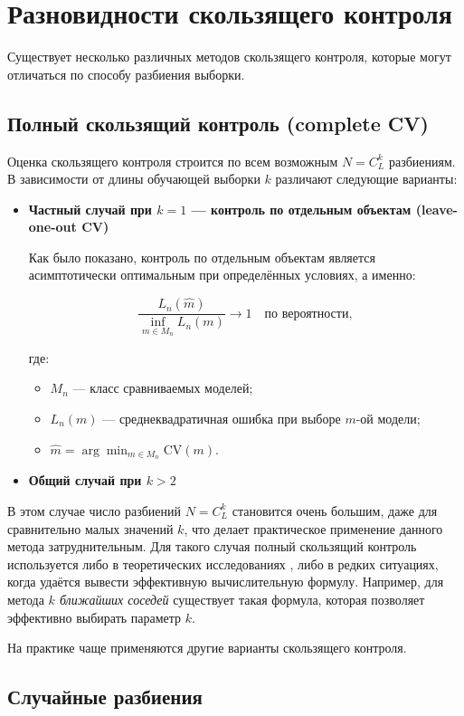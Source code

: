 \section{Разновидности скользящего контроля}
Существует несколько различных методов скользящего контроля, которые могут отличаться по способу разбиения выборки.
\subsection{Полный скользящий контроль (complete CV)}
Оценка скользящего контроля строится по всем возможным $N = C_L^k$ разбиениям. В зависимости от длины обучающей выборки $k$ различают следующие варианты:
\begin{itemize}

\item \textbf{Частный случай при $k=1$ — контроль по отдельным объектам (leave-one-out CV)}

Как было показано, контроль по отдельным объектам является асимптотически оптимальным при определённых условиях, а именно:

\[
\frac{L_n(\hat{m})}{\inf_{m \in M_n} L_n(m)} \to 1 \quad \text{по вероятности},
\]

где:

\begin{itemize}
  \item $M_n$ — класс сравниваемых моделей;
  \item $L_n(m)$ — среднеквадратичная ошибка при выборе $m$-ой модели;
  \item $\hat{m} = \arg \min_{m \in M_n} \text{CV}(m)$.
\end{itemize}

\item \textbf{Общий случай при $k>2$}
\end{itemize}

В этом случае число разбиений $N = C_L^k$ становится очень большим, даже для сравнительно малых значений $k$, что делает практическое применение данного метода затруднительным. Для такого случая полный скользящий контроль используется либо в теоретических исследованиях \cite{Voronov2004}, либо в редких ситуациях, когда удаётся вывести эффективную вычислительную формулу. Например, для метода \textit{$k$ ближайших соседей} существует такая формула, которая позволяет эффективно выбирать параметр $k$.

\medskip
На практике чаще применяются другие варианты скользящего контроля.

\subsection{Случайные разбиения}

